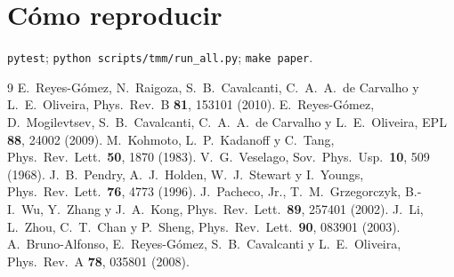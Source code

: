 \documentclass[11pt,a4paper]{article}
\begin{document}
\section{Cómo reproducir}
\texttt{pytest}; \texttt{python scripts/tmm/run\_all.py}; \texttt{make paper}.

\begin{thebibliography}{9}
E.~Reyes-Gómez, N.~Raigoza, S.~B.~Cavalcanti, C.~A.~A.~de Carvalho y L.~E.~Oliveira,
Phys.\ Rev.\ B \textbf{81}, 153101 (2010).
E.~Reyes-Gómez, D.~Mogilevtsev, S.~B.~Cavalcanti, C.~A.~A.~de Carvalho y L.~E.~Oliveira,
EPL \textbf{88}, 24002 (2009).
M.~Kohmoto, L.~P.~Kadanoff y C.~Tang, Phys.\ Rev.\ Lett.\ \textbf{50}, 1870 (1983).
V.~G.~Veselago, Sov.\ Phys.\ Usp.\ \textbf{10}, 509 (1968).
J.~B.~Pendry, A.~J.~Holden, W.~J.~Stewart y I.~Youngs, Phys.\ Rev.\ Lett.\ \textbf{76}, 4773 (1996).
J.~Pacheco, Jr., T.~M.~Grzegorczyk, B.-I.~Wu, Y.~Zhang y J.~A.~Kong,
Phys.\ Rev.\ Lett.\ \textbf{89}, 257401 (2002).
J.~Li, L.~Zhou, C.~T.~Chan y P.~Sheng, Phys.\ Rev.\ Lett.\ \textbf{90}, 083901 (2003).
A.~Bruno-Alfonso, E.~Reyes-Gómez, S.~B.~Cavalcanti y L.~E.~Oliveira,
Phys.\ Rev.\ A \textbf{78}, 035801 (2008).
\end{thebibliography}
\end{document}
